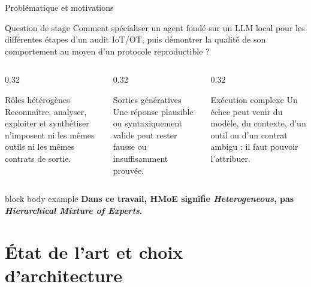 \documentclass[aspectratio=169,10pt]{beamer}
\newcommand{\keymessage}[1]{%
  \begin{beamercolorbox}[rounded=true,sep=1.1ex,wd=\linewidth]{block body example}
    \centering\bfseries #1
  \end{beamercolorbox}
}
\begin{document}
\begin{frame}{Problématique et motivations}
  \begin{alertblock}{Question de stage}
    \centering
    \large Comment spécialiser un agent fondé sur un LLM local pour les
    différentes étapes d'un audit IoT/OT, puis démontrer la qualité de son
    comportement au moyen d'un protocole reproductible ?
  \end{alertblock}

  \vspace{0.6em}
  \begin{columns}[T,onlytextwidth]
    \begin{column}{0.32\textwidth}
      \begin{block}{Rôles hétérogènes}
        Reconnaître, analyser, exploiter et synthétiser n'imposent ni les mêmes
        outils ni les mêmes contrats de sortie.
      \end{block}
    \end{column}
    \begin{column}{0.32\textwidth}
      \begin{block}{Sorties génératives}
        Une réponse plausible ou syntaxiquement valide peut rester fausse ou
        insuffisamment prouvée.
      \end{block}
    \end{column}
    \begin{column}{0.32\textwidth}
      \begin{block}{Exécution complexe}
        Un échec peut venir du modèle, du contexte, d'un outil ou d'un contrat
        ambigu : il faut pouvoir l'attribuer.
      \end{block}
    \end{column}
  \end{columns}

  \vfill
  \keymessage{Dans ce travail, HMoE signifie \emph{Heterogeneous}, pas \emph{Hierarchical Mixture of Experts}.}
\end{frame}

\section{État de l'art et choix d'architecture}
\end{document}
